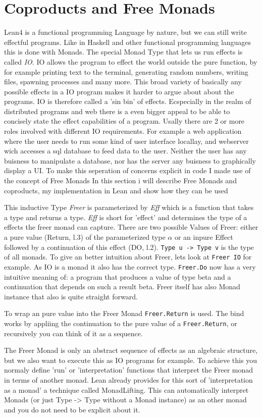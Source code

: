 \section{Coproducts and Free Monads}
Lean4 is a functional programming Language by nature, but we can still write effectful programs. Like in Haskell and other functional programming languages this is done with Monads. The special Monad Type that lets us run effects is called \emph{IO}. IO allows the program to effect the world outside the pure function, by for example printing text to the terminal, generating random numbers, writing files, spawning processes and many more. This broad variety of basically any possible effects in a IO program makes it harder to argue about about the programs.
IO is therefore called a 'sin bin' \cite{datatypes-a-la-carte} of effects. Ecspecially in the realm of distributed programs and web there is a even bigger appeal to be able to concisely state the effect capabilities of a program. Usally there are 2 or more roles involved with different IO requirements. For example a web application where the user needs to run some kind of user interface locallay, and webserver wich accesses a sql database to feed data to the user.
Neither the user has any buisness to manipulate a database, nor has the server any buisness to graphically display a UI. To make this seperation of concerns explicit in code I made use of the concept of Free Monads \cite{datatypes-a-la-carte}
In this section i will describe Free Monads and coproducts, my implementation in Lean and show how they can be used

This inductive Type \emph{Freer} is parameterized by \emph{Eff} which is a function that takes a type and returns a type. \emph{Eff} is short for 'effect' and determines the type of a effects the freer monad can capture. There are two possible Values of Freer: either a pure value (Return, l.3) of the parameterized type $\alpha$ or an inpure Effect followed by a continuation of this effect (DO, l.2).
\lstinline!Type u -> Type v! is the type of all monads.
To give an better intuition about Freer, lets look at \lstinline!Freer IO! for example. As IO is a monad it also has the correct type. \lstinline!Freer.Do! now has a very intuitive meaning of: a program that produces a value of type beta and a continuation that depends on such a result beta.
Freer itself has also Monad instance that also is quite straight forward.

To wrap an pure value into the Freer Monad \lstinline!Freer.Return! is used. The bind works by appliing the continuation to the pure value of a \lstinline!Freer.Return!, or recursively %
you can think of it as a sequence.

The Freer Monad is only an abstract sequence of effects as an algebraic structure, but we also want to execute this as IO programs for example. To achieve this you normaly define 'run' or 'interpretation' functions that interpret the Freer monad in terms of another monad. Lean already provides for this sort of 'interpretation as a monad' a technique called MonadLifting. This can automatically interpret Monads (or just Type -> Type without a Monad instance) as an other monad and you do not need to be explicit about it.
